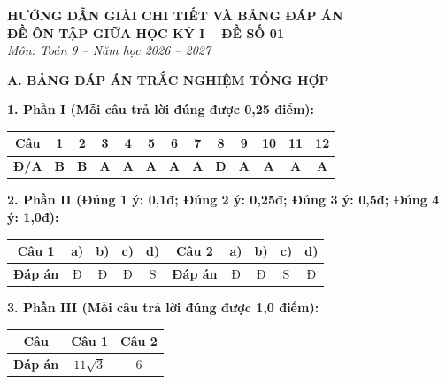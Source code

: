 \documentclass[12pt,a4paper]{article}
\begin{document}
\begin{center}
  \textbf{\Large HƯỚNG DẪN GIẢI CHI TIẾT VÀ BẢNG ĐÁP ÁN}\\
  \textbf{\large ĐỀ ÔN TẬP GIỮA HỌC KỲ I -- ĐỀ SỐ 01}\\
  \textit{Môn: Toán 9 -- Năm học 2026 -- 2027}
\end{center}
\vspace{2mm}

\noindent\textbf{\large A. BẢNG ĐÁP ÁN TRẮC NGHIỆM TỔNG HỢP}
\vspace{1mm}

\noindent\textbf{1. Phần I (Mỗi câu trả lời đúng được 0,25 điểm):}
\begin{center}
\begin{tabular}{|c|c|c|c|c|c|c|c|c|c|c|c|c|}
\hline
\textbf{Câu} & \textbf{1} & \textbf{2} & \textbf{3} & \textbf{4} & \textbf{5} & \textbf{6} & \textbf{7} & \textbf{8} & \textbf{9} & \textbf{10} & \textbf{11} & \textbf{12} \\
\hline
\textbf{Đ/A} & \textbf{B} & \textbf{B} & \textbf{A} & \textbf{A} & \textbf{A} & \textbf{A} & \textbf{A} & \textbf{D} & \textbf{A} & \textbf{A} & \textbf{A} & \textbf{A} \\
\hline
\end{tabular}
\end{center}
\vspace{0.5mm}

\noindent\textbf{2. Phần II (Đúng 1 ý: 0,1đ; Đúng 2 ý: 0,25đ; Đúng 3 ý: 0,5đ; Đúng 4 ý: 1,0đ):}
\begin{center}
\begin{tabular}{|c|c|c|c|c||c|c|c|c|c|}
\hline
\textbf{Câu 1} & \textbf{a)} & \textbf{b)} & \textbf{c)} & \textbf{d)} & \textbf{Câu 2} & \textbf{a)} & \textbf{b)} & \textbf{c)} & \textbf{d)} \\
\hline
\textbf{Đáp án} & Đ & Đ & Đ & S & \textbf{Đáp án} & Đ & Đ & S & Đ \\
\hline
\end{tabular}
\end{center}
\vspace{0.5mm}

\noindent\textbf{3. Phần III (Mỗi câu trả lời đúng được 1,0 điểm):}
\begin{center}
\begin{tabular}{|c|c|c|}
\hline
\textbf{Câu} & \textbf{Câu 1} & \textbf{Câu 2} \\
\hline
\textbf{Đáp án} & $11\sqrt{3}$ & $6$ \\
\hline
\end{tabular}
\end{center}
\vspace{2mm}
\end{document}
